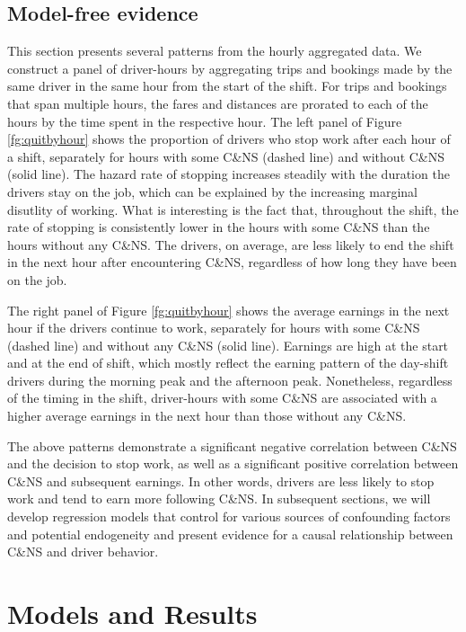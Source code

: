 \documentclass[reviewmode,AEJ]{AEA}
\begin{document}
\subsection{Model-free evidence}
This section presents several patterns from the hourly aggregated data. We construct a panel of driver-hours by aggregating trips and bookings made by the same driver in the same hour from the start of the shift. For trips and bookings that span multiple hours, the fares and distances are prorated to each of the hours by the time spent in the respective hour. 
The left panel of Figure \ref{fg:quitbyhour}
shows the proportion of drivers who stop work after each hour of a shift, separately for
hours with some C\&NS (dashed line) and without C\&NS (solid line).
The hazard rate of stopping increases steadily with the duration the drivers stay on the job, which can be explained by the increasing marginal disutlity of working. 
What is interesting is the fact that, throughout the shift, the rate of stopping is consistently lower in the hours with some C\&NS than the hours without any C\&NS. The drivers, on average, are less likely to end the shift in the next hour after encountering C\&NS, regardless of how long they have been on the job.

The right panel of Figure \ref{fg:quitbyhour} shows the average earnings in the next hour if the drivers continue to work, separately for hours with some C\&NS (dashed line) and without any C\&NS (solid line).
Earnings are high at the start and at the end of shift, which mostly reflect the earning pattern of the day-shift drivers during the morning peak and the afternoon peak. Nonetheless, regardless of the timing in the shift, driver-hours with some C\&NS are associated with a higher average earnings in the next hour than those without any C\&NS.


The above patterns demonstrate a significant negative correlation between C\&NS and the 
decision to stop work, as well as a significant positive correlation between C\&NS and subsequent earnings.
In other words, drivers are less likely to stop work and tend to earn more following C\&NS. In subsequent
sections, we will develop regression models  that control for various sources of confounding factors and
potential endogeneity and present evidence for a causal relationship between C\&NS and driver behavior.

\section{Models and Results}
\label{sec:main}
\end{document}
